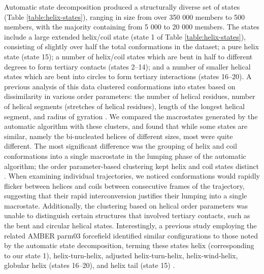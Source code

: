 Automatic state decomposition produced a structurally diverse set of states (Table \ref{table:helix-states}), ranging in size from over 350 000 members to 500 members, with the majority containing from 5 000 to 20 000 members.  
The states include a large extended helix/coil state (state 1 of Table \ref{table:helix-states}), consisting of slightly over half the total conformations in the dataset; a pure helix state (state 15); a number of helix/coil states which are bent in half to different degrees to form tertiary contacts (states 2--14); and a number of smaller helical states which are bent into circles to form tertiary interactions (states 16--20). 
A previous analysis of this data clustered conformations into states based on dissimilarity in various order parameters: the number of helical residues, number of helical segments (stretches of helical residues), length of the longest helical segment, and radius of gyration \cite{sorin:2005b}.
We compared the macrostates generated by the automatic algorithm with these clusters, and found that while some states are similar, namely the bi-nucleated helices of different sizes, most were quite different.
The most significant difference was the grouping of helix and coil conformations into a single macrostate in the lumping phase of the automatic algorithm; the order parameter-based clustering kept helix and coil states distinct \cite{sorin:2005b}.
When examining individual trajectories, we noticed conformations would rapidly flicker between helices and coils between consecutive frames of the trajectory, suggesting that their rapid interconversion justifies their lumping into a single macrostate.
Additionally, the clustering based on helical order parameters was unable to distinguish certain structures that involved tertiary contacts, such as the bent and circular helical states.
Interestingly, a previous study employing the related AMBER parm03 forcefield \cite{duan:2003a} identified similar configurations to those noted by the automatic state decomposition, terming these states helix (corresponding to our state 1), helix-turn-helix, adjusted helix-turn-helix, helix-wind-helix, globular helix (states 16--20), and helix tail (state 15) \cite{duan:jpcb:2004}.

